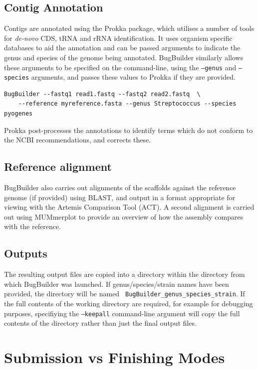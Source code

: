 \documentclass[a4paper,twoside,10pt]{article}
\begin{document}
\subsection{Contig Annotation}

Contigs are annotated using the Prokka package, which utilises a number of tools for
\textit{de-novo} CDS, tRNA and rRNA  identification. It uses organism specific databases to aid
the annotation and can be passed arguments to indicate the genus and species of the genome being
annotated. BugBuilder similarly allows these arguments to be specified on the command-line, using
the {\tt --genus} and {\tt --species} arguments, and passes these values to Prokka if they are provided. 

\begin{verbatim}
BugBuilder --fastq1 read1.fastq --fastq2 read2.fastq  \
    --reference myreference.fasta --genus Streptococcus --species pyogenes
\end{verbatim}

Prokka post-processes the annotations to identify terms which do not conform to the NCBI
recommendations, and corrects these. 

\subsection{Reference alignment}

BugBuilder also carries out alignments of the scaffolds against the reference genome (if provided)
using BLAST, and output in a format appropriate for viewing with the Artemis Comparison Tool (ACT).
A second alignment is carried out using MUMmerplot to provide an overview of how the assembly
compares with the reference.  

\subsection{Outputs}

The resulting output files are copied into a directory within the directory from which BugBuilder
was launched. If genus/species/strain names have been provided, the directory will be named {\tt
BugBuilder\_genus\_species\_strain}. If the full contents of the working directory are required, for
example for debugging purposes, specifiying the {\tt --keepall} command-line argument will copy the
full contents of the directory rather than just the final output files.

\section{Submission vs Finishing Modes}
\end{document}
